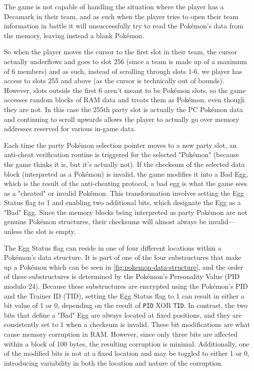 \documentclass[a4paper]{usiinfbachelorproject}
\begin{document}
The game is not capable of handling the situation where the player has a Decamark in their team, and as such when the player tries to open their team information in battle it will unsuccessfully try to read the Pokémon's data from the memory, leaving instead a blank Pokémon.


So when the player moves the cursor to the first slot in their team, the cursor actually underflows and goes to slot 256  (since a team is made up of a maximum of 6 members) and as such, instead of scrolling through slots 1-6, we player has access to slots 255 and above (as the cursor is technically out of bounds). However, slots outside the first 6 aren't meant to be Pokémon slots, so the game accesses random blocks of RAM data and treats them as Pokémon, even though they are not. In this case the 255th party slot is actually the PC Pokémon data and continuing to scroll upwards allows the player to actually go over memory addresses reserved for various in-game data.

Each time the party Pokémon selection pointer moves to a new party slot, an anti-cheat verification routine is triggered for the selected "Pokémon" (because the game thinks it is, but it's actually not). If the checksum of the selected data block (interpreted as a Pokémon) is invalid, the game modifies it into a Bad Egg, which is the result of the anti-cheating protocol, a bad egg is what the game sees as a "cheated" or invalid Pokémon. This transformation involves setting the Egg Status flag to 1 and enabling two additional bits, which designate the Egg as a "Bad" Egg. Since the memory blocks being interpreted as party Pokémon are not genuine Pokémon structures, their checksums will almost always be invalid—unless the slot is empty.

The Egg Status flag can reside in one of four different locations within a Pokémon's data structure. It is part of one of the four substructures that make up a Pokémon which can be seen in \ref{fig:pokemon-data-structure}, and the order of these substructures is determined by the Pokémon's Personality Value (PID modulo 24). Because these substructures are encrypted using the Pokémon’s PID and the Trainer ID (TID), setting the Egg Status flag to 1 can result in either a bit value of 1 or 0, depending on the result of \texttt{PID} XOR \texttt{TID}. In contrast, the two bits that define a "Bad" Egg are always located at fixed positions, and they are consistently set to 1 when a checksum is invalid. These bit modifications are what cause memory corruption in RAM. However, since only three bits are affected within a block of 100 bytes, the resulting corruption is minimal. Additionally, one of the modified bits is not at a fixed location and may be toggled to either 1 or 0, introducing variability in both the location and nature of the corruption.
\end{document}
